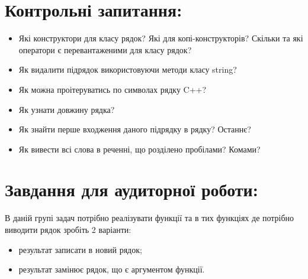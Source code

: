 \documentclass[a5paper,titlepage,openany,twoside,
]
{book_unv}%
\begin{document}
\section{Контрольні запитання:}
\begin{itemize}
\item
  Які конструктори для класу рядок? Які для копі-конструкторів? Скільки та
  які оператори є перевантаженими для класу рядок?
\item
  Як видалити підрядок використовуючи методи класу string?
\item
  Як можна проітеруватись по символах рядку C++?
\item
  Як узнати довжину рядка?
\item
  Як знайти перше входження даного підрядку в рядку? Останнє?
\item
  Як вивести всі слова в реченні, що розділено пробілами? Комами?
\end{itemize}

\section{Завдання для аудиторної роботи:}

В даній групі задач потрібно реалізувати функції та в тих функціях де
потрібно виводити рядок зробіть 2 варіанти:
\begin{itemize}
\item
 результат записати в новий рядок; 
\item
 результат замінює рядок, що є аргументом функції.
\end{itemize}
\end{document}
